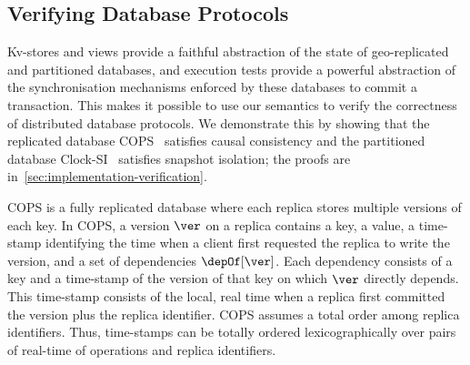 \subsection{Verifying Database Protocols}
\label{sec:verify-impl}
Kv-stores and views provide a 
faithful abstraction of the state of geo-replicated and partitioned
databases, and  execution tests provide a powerful abstraction of the synchronisation mechanisms 
enforced by these databases to commit a transaction. This makes it
possible to use our 
semantics to verify the correctness of distributed database protocols. 
We  demonstrate this by showing that  the replicated database 
COPS~\cite{cops} satisfies causal consistency  and the partitioned
database Clock-SI~\cite{clocksi} satisfies snapshot isolation; the
proofs are  in~\cref{sec:implementation-verification}. 

COPS is a fully replicated database where  each replica stores multiple versions of each key. 
In COPS, a version \( \ver \) on a replica contains a key, a value, a
time-stamp identifying the time when a client first requested the
replica to write the version, and a set of dependencies
$\depOf[\ver]$.  Each dependency consists of a key and a time-stamp of
the version of that key on which $\ver$ directly depends.  This
 time-stamp consists of the local, real time when a replica
first committed the version plus the replica identifier. COPS assumes
a total order among replica identifiers. Thus,  time-stamps can be
totally ordered lexicographically over pairs of real-time of
operations and replica identifiers.

